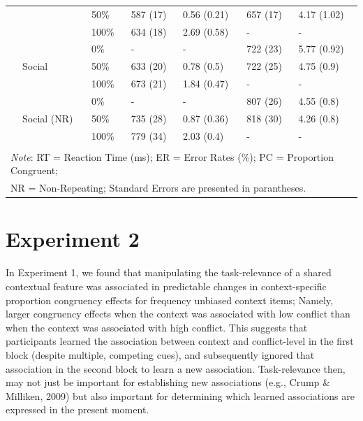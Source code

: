 \documentclass[english,,man,floatsintext]{apa6}
\begin{document}
\begin{table}[htbp]
\begin{tabular}{lllcccc}
& & \multicolumn{1}{l}{50\%} & \multicolumn{1}{l}{587 (17)} & \multicolumn{1}{l}{0.56 (0.21)} & \multicolumn{1}{l}{657 (17)} & \multicolumn{1}{l}{4.17 (1.02)} \\
& & \multicolumn{1}{l}{100\%} & \multicolumn{1}{l}{634 (18)} & \multicolumn{1}{l}{2.69 (0.58)} & \multicolumn{1}{l}{-} & \multicolumn{1}{l}{-} \\
\cmidrule(rl){2-7}
& \multirow{3}{*}{Social} & \multicolumn{1}{l}{0\%} & \multicolumn{1}{l}{-} & \multicolumn{1}{l}{-} & \multicolumn{1}{l}{722 (23)} & \multicolumn{1}{l}{5.77 (0.92)} \\
& & \multicolumn{1}{l}{50\%} & \multicolumn{1}{l}{633 (20)} & \multicolumn{1}{l}{0.78 (0.5)} & \multicolumn{1}{l}{722 (25)} & \multicolumn{1}{l}{4.75 (0.9)} \\
& & \multicolumn{1}{l}{100\%} & \multicolumn{1}{l}{673 (21)} & \multicolumn{1}{l}{1.84 (0.47)} & \multicolumn{1}{l}{-} & \multicolumn{1}{l}{-} \\
\cmidrule(rl){2-7}
& \multirow{3}{*}{Social (NR)} & \multicolumn{1}{l}{0\%} & \multicolumn{1}{l}{-} & \multicolumn{1}{l}{-} & \multicolumn{1}{l}{807 (26)} & \multicolumn{1}{l}{4.55 (0.8)} \\
& & \multicolumn{1}{l}{50\%} & \multicolumn{1}{l}{735 (28)} & \multicolumn{1}{l}{0.87 (0.36)} & \multicolumn{1}{l}{818 (30)} & \multicolumn{1}{l}{4.26 (0.8)} \\
& & \multicolumn{1}{l}{100\%} & \multicolumn{1}{l}{779 (34)} & \multicolumn{1}{l}{2.03 (0.4)} & \multicolumn{1}{l}{-} & \multicolumn{1}{l}{-} \\
 & & & & & & \\
\bottomrule
\multicolumn{7}{l}{\textit{Note}: RT = Reaction Time (ms);  ER = Error Rates (\%); PC = Proportion Congruent;} \\
\multicolumn{7}{l}{NR = Non-Repeating; Standard Errors are presented in parantheses.} \\
\end{tabular}%
\end{table}

\hypertarget{experiment-2}{%
\section{Experiment 2}\label{experiment-2}}

In Experiment 1, we found that manipulating the task-relevance of a shared contextual feature was associated in predictable changes in context-specific proportion congruency effects for frequency unbiased context items; Namely, larger congruency effects when the context was associated with low conflict than when the context was associated with high conflict. This suggests that participants learned the association between context and conflict-level in the first block (despite multiple, competing cues), and subsequently ignored that association in the second block to learn a new association. Task-relevance then, may not just be important for establishing new associations (e.g., Crump \& Milliken, 2009) but also important for determining which learned associations are expressed in the present moment.
\end{document}
